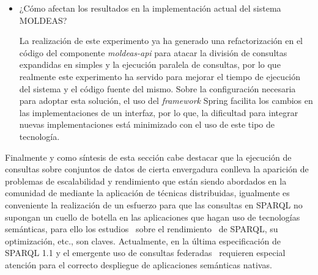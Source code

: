 \begin{itemize}
 \item ¿Cómo afectan los resultados en la implementación actual del sistema \gls{MOLDEAS}?

La realización de este experimento ya ha generado una refactorización en el código del componente \textit{moldeas-api} para atacar 
la división de consultas expandidas en simples y la ejecución paralela de consultas, por lo que realmente este experimento 
ha servido para mejorar el tiempo de ejecución del sistema y el código fuente del mismo. Sobre la configuración necesaria 
para adoptar esta solución, el uso del \textit{framework} Spring facilita los cambios en las implementaciones de un interfaz, por lo que,
la dificultad para integrar nuevas implementaciones está minimizado con el uso de este tipo de tecnología.
\end{itemize}

Finalmente y como síntesis de esta sección cabe destacar que la ejecución de consultas sobre conjuntos de datos de cierta 
envergadura conlleva la aparición de problemas de escalabilidad y rendimiento que están siendo abordados en la comunidad 
de \linkeddata mediante la aplicación de técnicas distribuidas, igualmente es conveniente la realización de un esfuerzo 
para que las consultas en \gls{SPARQL} no supongan un cuello de botella en las aplicaciones que hagan uso de tecnologías 
semánticas, para ello los estudios~\cite{SparqlSemantics} sobre el rendimiento~\cite{Schmidt2010,Bernstein07optarq:a} de SPARQL, su optimización, etc., son claves. Actualmente, 
en la última especificación de SPARQL 1.1 y el emergente uso de consultas federadas~\cite{sparqlOpt} requieren especial atención para 
el correcto despliegue de aplicaciones semánticas nativas.


% 












